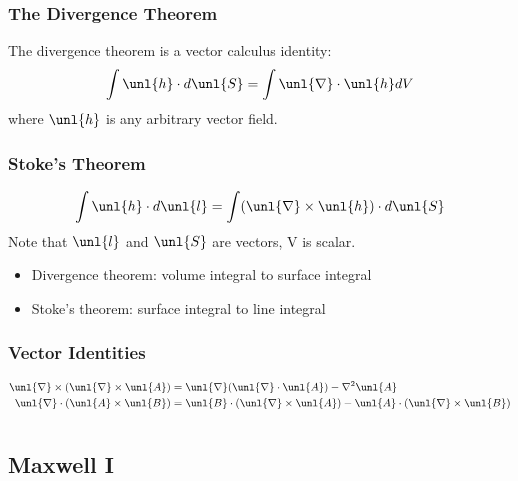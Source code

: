 \documentclass[a4paper, 11pt, normalem]{report}
\newcommand\del{\unl{\nabla}}
\newcommand\A{\unl{A}}
\begin{document}
\subsection{The Divergence Theorem}
The divergence theorem is a vector calculus identity:
\begin{equation}
    \int \unl{h}\cdot d\unl{S} = \int \del \cdot \unl{h}dV
\end{equation}
where $\unl{h}$ is any arbitrary vector field.

\subsection{Stoke's Theorem}
\begin{equation}
    \int \unl{h}\cdot d\unl{l} = \int (\del \times \unl{h}) \cdot d\unl{S}
\end{equation}
Note that $\unl{l}$ and $\unl{S}$ are vectors, V is scalar.
\begin{itemize}
    \item Divergence theorem: volume integral to surface integral
    \item Stoke's theorem: surface integral to line integral
\end{itemize}

\subsection{Vector Identities}
\begin{align}
    \del \times (\del \times \A) &= \del(\del \cdot \A) - \nabla^2 \A \\
    \del \cdot (\A \times \unl{B}) &= \unl{B}\cdot(\del \times \A) - \A \cdot (\del \times \unl{B})
\end{align}

\chapter{}
\section{Maxwell \RN{1}}
\end{document}
